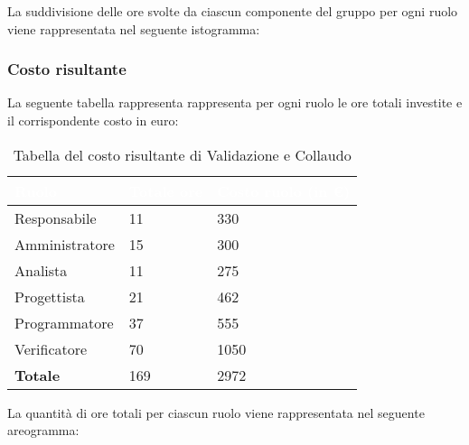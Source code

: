La suddivisione delle ore svolte da ciascun componente del gruppo per ogni ruolo viene rappresentata nel seguente istogramma:
\begin{center}
	\pgfplotsset{width=17cm, height=8.5cm}
\end{center}
\clearpage

\clearpage

\subsubsection{Costo risultante}
La seguente tabella rappresenta rappresenta per ogni ruolo le ore totali investite e il corrispondente costo in euro:
{
\renewcommand{\arraystretch}{2}
\begin{longtable}{ C{3cm} C{2cm} C{4cm}}
\caption{Tabella del costo risultante di Validazione e Collaudo}\\

\textcolor{white}{\textbf{Ruolo}} & 
\textcolor{white}{\textbf{Totale ore}} & 
\textcolor{white}{\textbf{Costo ruolo (in \euro{})}}\\	
\endhead
        
Responsabile    &  11 &  330 \\
Amministratore  &  15 &  300 \\
Analista        &  11 &  275 \\
Progettista     &  21 &  462 \\
Programmatore   &  37 &  555 \\
Verificatore    &  70 & 1050 \\
\textbf{Totale} & 169 & 2972 \\
	
\end{longtable}
}

La quantità di ore totali per ciascun ruolo viene rappresentata nel seguente areogramma:
\begin{center}
\end{center}
